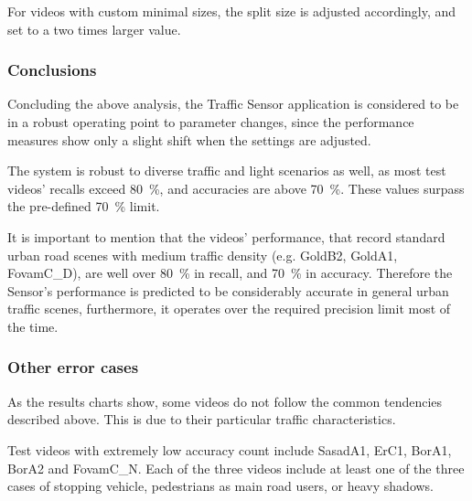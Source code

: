 For videos with custom minimal sizes, the split size is adjusted accordingly, and set to a two times larger value.

\subsubsection{Conclusions}
Concluding the above analysis, the Traffic Sensor application is considered to be in a robust operating point to parameter changes, since the performance measures show only a slight shift when the settings are adjusted.

The system is robust to diverse traffic and light scenarios as well, as most test videos' recalls exceed \SI{80}{\%}, and accuracies are above \SI{70}{\%}. These values surpass the pre-defined \SI{70}{\%} limit.

It is important to mention that the videos' performance, that record standard urban road scenes with medium traffic density (e.g. GoldB2, GoldA1, FovamC\_D), are well over \SI{80}{\%} in recall, and \SI{70}{\%} in accuracy.
Therefore the Sensor's performance is predicted to be considerably accurate in general urban traffic scenes, furthermore, it operates over the required precision limit most of the time.

\subsubsection{Other error cases}
As the results charts show, some videos do not follow the common tendencies described above.
This is due to their particular traffic characteristics.

Test videos with extremely low accuracy count include SasadA1, ErC1, BorA1, BorA2 and FovamC\_N.
Each of the three videos include at least one of the three cases of stopping vehicle, pedestrians as main road users, or heavy shadows.

